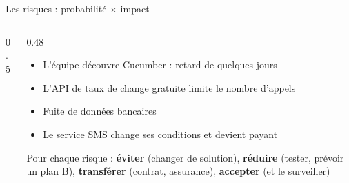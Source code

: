\documentclass[aspectratio=169,10pt]{beamer}
\begin{document}
\begin{frame}{Les risques : probabilité $\times$ impact}
  \begin{columns}[c]
    \begin{column}{0.5\textwidth}
      \begin{center}
      \end{center}
    \end{column}
    \begin{column}{0.48\textwidth}
      \small
      \begin{itemize}
        \item[A] L'équipe découvre Cucumber : retard de quelques jours
        \item[B] L'API de taux de change gratuite limite le nombre d'appels
        \item[C] Fuite de données bancaires
        \item[D] Le service SMS change ses conditions et devient payant
      \end{itemize}
      \vspace{2mm}
      Pour chaque risque : \textbf{éviter} (changer de solution), \textbf{réduire} (tester, prévoir un plan B), \textbf{transférer} (contrat, assurance), \textbf{accepter} (et le surveiller)
    \end{column}
  \end{columns}
\end{frame}
\end{document}
